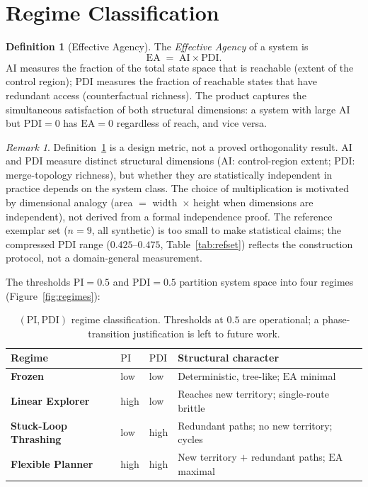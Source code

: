 \documentclass[11pt,letterpaper]{article}
\theoremstyle{plain}
\theoremstyle{definition}
\newtheorem{definition}[theorem]{Definition}
\theoremstyle{remark}
\newtheorem{remark}[theorem]{Remark}
\newcommand{\PDI}{\mathrm{PDI}}
\newcommand{\AI}{\mathrm{AI}}
\newcommand{\PI}{\mathrm{PI}}
\newcommand{\EA}{\mathrm{EA}}
\begin{document}
\section{Regime Classification}
\label{sec:regimes}

\begin{definition}[Effective Agency]
  \label{def:ea}
  The \emph{Effective Agency} of a system is
  \[
    \EA \;=\; \AI \times \PDI.
  \]
  $\AI$ measures the fraction of the total state space that is reachable
  (extent of the control region); $\PDI$ measures the fraction of reachable
  states that have redundant access (counterfactual richness).
  The product captures the simultaneous satisfaction of both structural
  dimensions: a system with large $\AI$ but $\PDI = 0$ has $\EA = 0$
  regardless of reach, and vice versa.
\end{definition}

\begin{remark}
  Definition~\ref{def:ea} is a design metric, not a proved orthogonality
  result.
  $\AI$ and $\PDI$ measure distinct structural dimensions
  ($\AI$: control-region extent; $\PDI$: merge-topology richness),
  but whether they are statistically independent in practice depends on
  the system class.
  The choice of multiplication is motivated by dimensional analogy
  (area $=$ width~$\times$ height when dimensions are independent),
  not derived from a formal independence proof.
  The reference exemplar set ($n = 9$, all synthetic) is too small to
  make statistical claims; the compressed $\PDI$ range
  ($0.425$--$0.475$, Table~\ref{tab:refset}) reflects the construction
  protocol, not a domain-general measurement.
\end{remark}

The thresholds $\PI = 0.5$ and $\PDI = 0.5$ partition system space into
four regimes (Figure~\ref{fig:regimes}):

\begin{table}[h]
  \centering
  \small
  \begin{tabular}{llll}
    \toprule
    Regime & $\PI$ & $\PDI$ & Structural character \\
    \midrule
    \textbf{Frozen}             & low  & low  & Deterministic, tree-like; $\EA$ minimal \\
    \textbf{Linear Explorer}    & high & low  & Reaches new territory; single-route brittle \\
    \textbf{Stuck-Loop Thrashing} & low & high & Redundant paths; no new territory; cycles \\
    \textbf{Flexible Planner}   & high & high & New territory $+$ redundant paths; $\EA$ maximal \\
    \bottomrule
  \end{tabular}
  \caption{$(\PI, \PDI)$ regime classification.
    Thresholds at $0.5$ are operational; a phase-transition
    justification is left to future work.}
  \label{tab:regimes}
\end{table}
\end{document}
